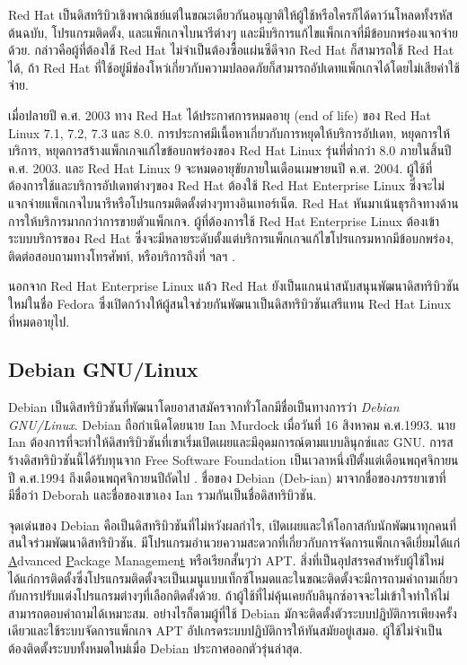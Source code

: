 \begin{thwbr}
{Red Hat เป็นดิสทริบิวเชิงพาณิชย์แต่ในขณะเดียวกันอนุญาติให้ผู้ใช้หรือใครก็ได้ดาว์นโหลดทั้งรหัสต้นฉบับ, โปรแกรมติดตั้ง, และแพ็กเกจไบนารีต่างๆ และมีบริการแก้ไขแพ็กเกจที่มีข้อบกพร่องแจกจ่ายด้วย. กล่าวคือผู้ที่ต้องใช้ Red Hat ไม่จำเป็นต้องซื้อแผ่นซีดีจาก Red Hat ก็สามารถใช้ Red Hat ได้, ถ้า Red Hat ที่ใช้อยู่มีช่องโหว่เกี่ยวกับความปลอดภัยก็สามารถอัปเดทแพ็กเกจได้โดยไม่เสียค่าใช้จ่าย. 

เมื่อปลายปี ค.ศ. 2003 ทาง Red Hat \cite{eol} ได้ประกาศการหมดอายุ (end of life) ของ Red Hat Linux 7.1, 7.2, 7.3 และ 8.0. การประกาศมีเนื้อหาเกี่ยวกับการหยุดให้บริการอัปเดท, หยุดการให้บริการ, หยุดการสร้างแพ็กเกจแก้ไขข้อบกพร่องของ Red Hat Linux รุ่นที่ต่ำกว่า 8.0 ภายในสิ้นปี ค.ศ. 2003. และ Red Hat Linux 9 จะหมดอายุขัยภายในเดือนเมษายนปี ค.ศ. 2004. ผู้ใช้ที่ต้องการใช้และบริการอัปเดทต่างๆของ Red Hat ต้องใช้ Red Hat Enterprise Linux ซึ่งจะไม่แจกจ่ายแพ็กเกจไบนารีหรือโปรแกรมติดตั้งต่างๆทางอินเทอร์เน็ต. Red Hat หันมาเน้นธุรกิจทางด้านการให้บริการมากกว่าการขายตัวแพ็กเกจ. ผู้ที่ต้องการใช้ Red Hat Enterprise Linux ต้องเข้าระบบบริการของ Red Hat ซึ่งจะมีหลายระดับตั้งแต่บริการแพ็กเกจแก้ไขโปรแกรมหากมีข้อบกพร่อง, ติดต่อสอบถามทางโทรศัพท์, หรือบริการถึงที่ ฯลฯ \cite{rhel}.

นอกจาก Red Hat Enterprise Linux แล้ว Red Hat ยังเป็นแกนนำสนับสนุนพัฒนาดิสทริบิวชันใหม่ในชื่อ Fedora \cite{fedora} ซึ่งเปิดกว้างให้ผู้สนใจช่วยกันพัฒนาเป็นดิสทริบิวชันเสรีแทน Red Hat Linux ที่หมดอายุไป.


\subsection{{\latintext Debian GNU/Linux}}%

Debian เป็นดิสทริบิวชันที่พัฒนาโดยอาสาสมัครจากทั่วโลกมีชื่อเป็นทางการว่า {\em Debian GNU/Linux}. Debian ถือกำเนิดโดยนาย Ian Murdock เมื่อวันที่ 16 สิงหาคม ค.ศ.1993. นาย Ian ต้องการที่จะทำให้ดิสทริบิวชันที่เขาเริ่มเปิดเผยและมีอุดมการณ์ตามแบบลินุกซ์และ GNU. การสร้างดิสทริบิวชันนี้ได้รับทุนจาก Free Software Foundation เป็นเวลาหนึ่งปีตั้งแต่เดือนพฤศจิกายนปี ค.ศ.1994 ถึงเดือนพฤศจิกายนปีถัดไป \cite{debianhistory}. ชื่อของ Debian (Deb-ian) มาจากชื่อของภรรยาเขาที่มีชื่อว่า Deborah และชื่อของเขาเอง Ian รวมกันเป็นชื่อดิสทริบิวชัน.
 
จุดเด่นของ Debian คือเป็นดิสทริบิวชันที่ไม่หวังผลกำไร, เปิดเผยและให้โอกาสกับนักพัฒนาทุกคนที่สนใจร่วมพัฒนาดิสทริบิวชัน. มีโปรแกรมอำนวยความสะดวกที่เกี่ยวกับการจัดการแพ็กเกจดีเยี่ยมได้แก่ \underline{A}dvanced \underline{P}ackage Managemen\underline{t} หรือเรียกสั้นๆว่า APT. สิ่งที่เป็นอุปสรรคสำหรับผู้ใช้ใหม่ได้แก่การติดตั้งซึ่งโปรแกรมติดตั้งจะเป็นเมนูแบบเท็กซ์โหมดและในขณะติดตั้งจะมีการถามคำถามเกี่ยวกับการปรับแต่งโปรแกรมต่างๆที่เลือกติดตั้งด้วย. ถ้าผู้ใช้ที่ไม่คุ้นเคยกับลินุกซ์อาจจะไม่เข้าใจทำให้ไม่สามารถตอบคำถามได้เหมาะสม. อย่างไรก็ตามผู้ที่ใช้ Debian มักจะติดตั้งตัวระบบปฏิบัติการเพียงครั้งเดียวและใช้ระบบจัดการแพ็กเกจ APT อัปเกรดระบบปฏิบัติการให้ทันสมัยอยู่เสมอ. ผู้ใช้ไม่จำเป็นต้องติดตั้งระบบทั้งหมดใหม่เมื่อ Debian ประกาศออกตัวรุ่นล่าสุด. 

}
\end{thwbr}
